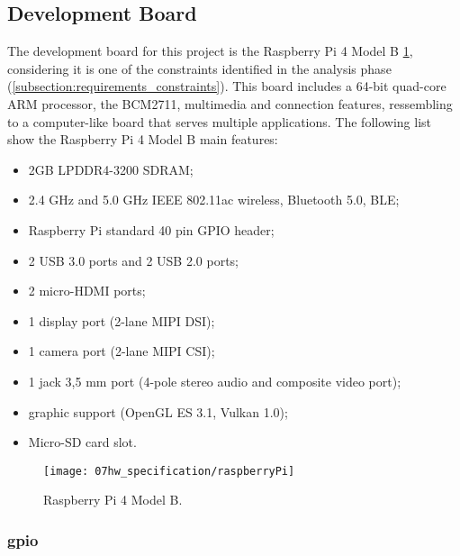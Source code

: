 \subsection{Development Board}

The development board for this project is the Raspberry Pi 4 Model B \ref{fig:rasp}, considering it is one of the constraints identified in the analysis phase (\ref{subsection:requirements_constraints}). This board includes a 64-bit quad-core ARM processor, the BCM2711, multimedia and connection features, ressembling to a computer-like board that serves multiple applications. The following list show the Raspberry Pi 4 Model B main features:

\begin{itemize}
        \item 2GB LPDDR4-3200 SDRAM;
        \item 2.4 GHz and 5.0 GHz IEEE 802.11ac wireless, Bluetooth 5.0, BLE;
        \item Raspberry Pi standard 40 pin GPIO header;   
        \item 2 USB 3.0 ports and 2 USB 2.0 ports;
        \item 2 micro-HDMI ports;
        \item 1 display port (2-lane MIPI DSI);
        \item 1 camera port (2-lane MIPI CSI);
        \item 1 jack 3,5 mm port (4-pole stereo audio and composite video port);
		\item graphic support (OpenGL ES 3.1, Vulkan 1.0);
		\item Micro-SD card slot.
\end{itemize}



\begin{figure}[ht]
	\centering
	\texttt{[image: 07hw\_specification/raspberryPi]}
	\caption{Raspberry Pi 4 Model B.}
	\label{fig:rasp}
\end{figure}

\subsubsection{\ac{gpio}}

